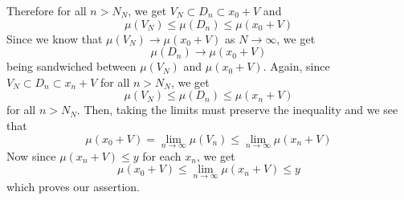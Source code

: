 \documentclass[12pt]{exam}
\theoremstyle{plain} %
\theoremstyle{definition} %
\theoremstyle{remark} %
\begin{document}
\begin{questions}
\begin{solution}
    Therefore for all $n > N_N$, we get $V_N \subset D_n \subset x_0 + V $
    and \[
      \mu(V_N) \le \mu(D_n) \le \mu(x_0 + V)
    \]
    Since we know that $\mu(V_N)
    \to \mu(x_0 + V)$ as $N \to \infty$, we get  $$\mu(D_n) \to \mu(x_0 + V)$$
    being sandwiched between $\mu(V_N)$ and $\mu(x_0 + V)$. Again,
    since $V_N \subset D_n \subset x_n + V$ for all $n > N_N$, we get \[
      \mu(V_N) \le \mu(D_n) \le \mu(x_n + V)
    \]
    for all $n > N_N$.
    Then, taking the limits must preserve the inequality and we see that
    \[
      \mu(x_0 + V) = \lim_{n \to \infty} \mu(V_n) \le \lim_{n \to
      \infty} \mu(x_n + V)
    \]
    Now since $\mu(x_n + V) \le y$ for each $x_n$,  we get \[
      \mu(x_0 + V) \le \lim_{n \to \infty}  \mu(x_n + V) \le y
    \]
    which proves our assertion.
  \end{solution}

\end{questions}
\printbibliography[heading=bibintoc]
\end{document}
